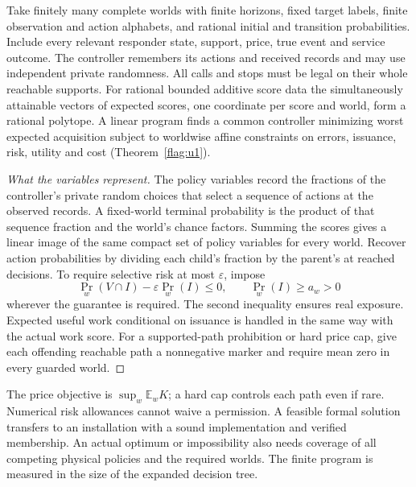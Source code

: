 \begin{theorem}\label{body:jointthm}
Take finitely many complete worlds with finite horizons, fixed target labels, finite observation and action alphabets, and rational initial and transition probabilities. Include every relevant responder state, support, price, true event and service outcome. The controller remembers its actions and received records and may use independent private randomness. All calls and stops must be legal on their whole reachable supports. For rational bounded additive score data the simultaneously attainable vectors of expected scores, one coordinate per score and world, form a rational polytope. A linear program finds a common controller minimizing worst expected acquisition subject to worldwise affine constraints on errors, issuance, risk, utility and cost (Theorem~\ref{flag:u1}).
\end{theorem}
\begin{proof}[What the variables represent]
The policy variables record the fractions of the controller's private random choices that select a sequence of actions at the observed records. A fixed-world terminal probability is the product of that sequence fraction and the world's chance factors. Summing the scores gives a linear image of the same compact set of policy variables for every world. Recover action probabilities by dividing each child's fraction by the parent's at reached decisions. To require selective risk at most \(\varepsilon\), impose
\[
 \Pr_w(V\cap I)-\varepsilon\Pr_w(I)\le0,\qquad
 \Pr_w(I)\ge a_w>0
\]
wherever the guarantee is required. The second inequality ensures real exposure. Expected useful work conditional on issuance is handled in the same way with the actual work score. For a supported-path prohibition or hard price cap, give each offending reachable path a nonnegative marker and require mean zero in every guarded world.
\end{proof}
The price objective is \(\sup_w\mathbb E_wK\); a hard cap controls each path even if rare. Numerical risk allowances cannot waive a permission. A feasible formal solution transfers to an installation with a sound implementation and verified membership. An actual optimum or impossibility also needs coverage of all competing physical policies and the required worlds. The finite program is measured in the size of the expanded decision tree.

